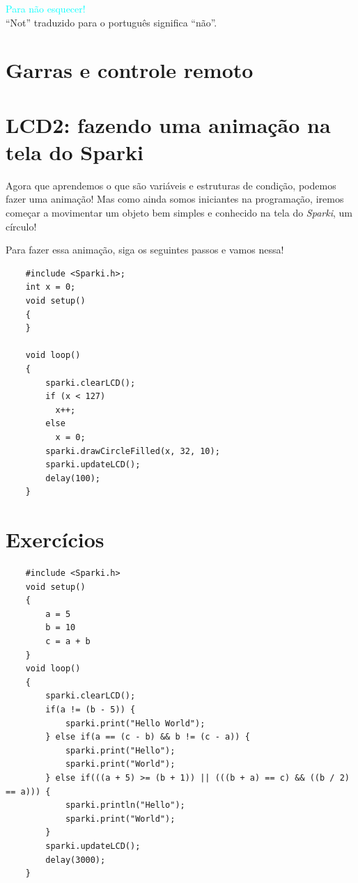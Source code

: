     \begin{center}
        \textcolor{cyan}{Para não esquecer!}
        \\``Not'' traduzido para o português significa ``não''.
    \end{center}
 
\section{Garras e controle remoto}

\section{LCD2: fazendo uma animação na tela do Sparki}

    Agora que aprendemos o que são variáveis e estruturas de condição, podemos fazer uma animação! Mas como ainda somos iniciantes na programação, iremos começar a movimentar um objeto bem simples e conhecido na tela do \textsl{Sparki}, um círculo!\par
    Para fazer essa animação, siga os seguintes passos e vamos nessa!
    
    \begin{verbatim}
    #include <Sparki.h>;
    int x = 0;
    void setup()
    {
    }
     
    void loop()
    {
        sparki.clearLCD();
        if (x < 127)
          x++;
        else
          x = 0;
        sparki.drawCircleFilled(x, 32, 10);
        sparki.updateLCD();
        delay(100);
    }
    \end{verbatim}

\section{Exercícios}


    \begin{verbatim}
    #include <Sparki.h>
    void setup()
    {
        a = 5
        b = 10
        c = a + b
    }
    void loop()
    {
        sparki.clearLCD();
        if(a != (b - 5)) {
            sparki.print("Hello World");
        } else if(a == (c - b) && b != (c - a)) {
            sparki.print("Hello");
            sparki.print("World");
        } else if(((a + 5) >= (b + 1)) || (((b + a) == c) && ((b / 2) == a))) {
            sparki.println("Hello");
            sparki.print("World");
        }
        sparki.updateLCD();
        delay(3000);
    }
    \end{verbatim}
    
